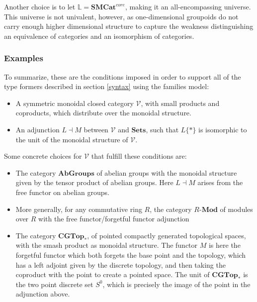 \documentclass[a4paper,english]{lipics-v2018}
\begin{document}
  
  Another choice is to let ${\mathbb{L}} = \mathbf{SMCat}^{core}$, making it an all-encompassing universe. This universe is not univalent, however, as one-dimensional groupoids do not carry enough higher dimensional structure to capture the weakness distinguishing an equivalence of categories and an isomorphism of categories.

  \subsubsection{Examples}
To summarize, these are the conditions imposed in order to support all of the type formers described in section \ref{syntax} using the families model:
\begin{itemize}
\item A symmetric monoidal closed category $\mathcal{V}$, with small products and coproducts, which distribute over the monoidal structure.
\item An adjunction $L \dashv M$ between $\mathcal{V}$ and $\mathbf{Sets}$, such that $L\{*\}$ is isomorphic to the unit of the monoidal structure of $\mathcal{V}$.
\end{itemize}
Some concrete choices for $\mathcal{V}$ that fulfill these conditions are:
\begin{itemize}
\item The category $\mathbf{AbGroups}$ of abelian groups with the monoidal structure given by the tensor product of abelian groups. Here $L \dashv M$ arises from the free functor on abelian groups.
\item More generally, for any commutative ring $R$, the category $R$-$\mathbf{Mod}$ of modules over $R$ with the free functor/forgetful functor adjunction
\item The category $\mathbf{CGTop}_*$, of pointed compactly generated topological spaces, with the smash product as monoidal structure. The functor $M$ is here the forgetful functor which both forgets the base point and the topology, which has a left adjoint given by the discrete topology, and then taking the coproduct with the point to create a pointed space. The unit of $\mathbf{CGTop}_*$ is the two point discrete set $S^0$, which is precisely the image of the point in the adjunction above.
\end{itemize}


\end{document}
